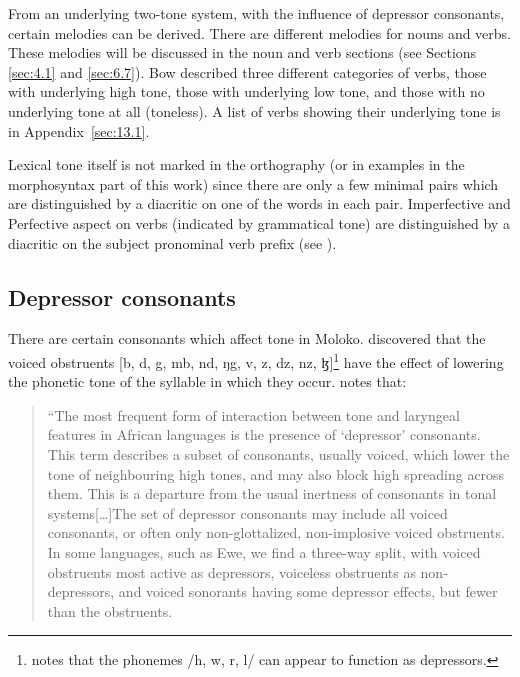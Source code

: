 From an underlying two-tone system, with the influence of depressor consonants, certain melodies can be derived.  There are different melodies for nouns and verbs. These melodies will be discussed in the noun and verb sections (see Sections \ref{sec:4.1} and \ref{sec:6.7}). Bow described three different categories of verbs, those with underlying high tone, those with underlying low tone, and those with no underlying tone at all (toneless). A list of verbs showing their underlying tone is in Appendix~\ref{sec:13.1}.

Lexical tone itself is not marked in the orthography (or in examples in the morphosyntax part of this work) since there are only a few minimal pairs which are distinguished by a diacritic on one of the words in each pair. Imperfective and Perfective aspect on verbs (indicated by grammatical tone) are distinguished by a diacritic on the subject pronominal verb prefix (see ). 

\subsection{Depressor consonants}\label{sec:2.4.1}
\hypertarget{RefHeading1210641525720847}{}
There are certain consonants which affect tone in Moloko.  \citet{Bow1997c} discovered that the voiced obstruents [b, d, g, mb, nd, ŋg, v, z, dz, nz, ɮ]\footnote{\citet{Bow1997c} notes that the phonemes /h, w, r, l/ can appear to function as depressors.} have the effect of lowering the phonetic tone of the syllable in which they occur.  \cite[113, 158]{Yip2002} notes that: 

\begin{quote}
“The most frequent form of interaction between tone and laryngeal features in African languages is the presence of ‘depressor' consonants. This term describes a subset of consonants, usually voiced, which lower the tone of neighbouring high tones, and may also block high spreading across them. This is a departure from the usual inertness of consonants in tonal systems[…]The set of depressor consonants may include all voiced consonants, or often only non-glottalized, non-implosive voiced obstruents. In some languages, such as Ewe, we find a three-way split, with voiced obstruents most active as depressors, voiceless obstruents as non-depressors, and voiced sonorants having some depressor effects, but fewer than the obstruents.{\textquotedbl}
\end{quote}

